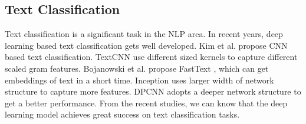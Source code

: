 \subsection{Text Classification}
\label{sec:textclassification}
Text classification is a significant task in the NLP area. In recent years, deep learning based text classification gets well developed. Kim et al. \cite{DBLP:conf/emnlp/Kim14} propose CNN based text classification. TextCNN use different sized kernels to capture different scaled gram features. Bojanowski et al. propose FastText  \cite{DBLP:journals/tacl/BojanowskiGJM17}, which can get embeddings of text in a short time. Inception \cite{DBLP:journals/corr/SzegedyLJSRAEVR14} uses larger width of network structure to capture more features. DPCNN \cite{DBLP:conf/acl/JohnsonZ17} adopts a deeper network structure to get a better performance. From the recent studies, we can know that the deep learning model achieves great success on text classification tasks.
